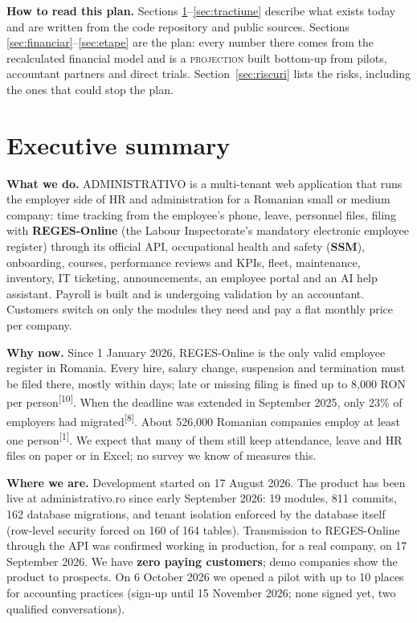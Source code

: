 \documentclass[10pt,a4paper]{article}
\newcommand{\src}[1]{\textsuperscript{\textcolor{brandSlate}{[#1]}}}
\newcommand{\proj}{\textcolor{brandTeal}{\textsc{projection}}}
\begin{document}
\tableofcontents
\vspace{6pt}
\begin{faptbox}
\small\textbf{How to read this plan.} Sections \ref{sec:rezumat}--\ref{sec:tractiune} describe what exists today and are written from
the code repository and public sources. Sections \ref{sec:financiar}--\ref{sec:etape} are the plan: every number there comes from the
recalculated financial model and is a \proj{} built bottom-up from pilots, accountant partners and
direct trials. Section~\ref{sec:riscuri} lists the risks, including the ones that could stop the plan.
\end{faptbox}

\section{Executive summary}\label{sec:rezumat}\nobreak

\textbf{What we do.} ADMINISTRATIVO is a multi-tenant web application that runs the
employer side of HR and administration for a Romanian small or medium company: time
tracking from the employee's phone, leave, personnel files, filing with
\textbf{REGES-Online} (the Labour Inspectorate's mandatory electronic employee register)
through its official API, occupational health and safety (\textbf{SSM}), onboarding,
courses, performance reviews and KPIs, fleet, maintenance, inventory, IT ticketing,
announcements, an employee portal and an AI help assistant. Payroll is built and is
undergoing validation by an accountant. Customers switch on only the modules they need and
pay a flat monthly price per company.

\textbf{Why now.} Since 1 January 2026, REGES-Online is the only valid employee register in
Romania. Every hire, salary change, suspension and termination must be filed there, mostly
within days; late or missing filing is fined up to 8,000 RON per person\src{10}. When the
deadline was extended in September 2025, only 23\% of employers had migrated\src{8}. About
526,000 Romanian companies employ at least one person\src{1}. We expect that many of them still
keep attendance, leave and HR files on paper or in Excel; no survey we know of measures this.

\textbf{Where we are.} Development started on 17 August 2026. The product has been live at
administrativo.ro since early September 2026: 19 modules, 811 commits, 162 database migrations,
and tenant isolation enforced by the database itself (row-level security forced on 160 of 164
tables). Transmission to REGES-Online through the API was confirmed working in production, for a
real company, on 17 September 2026. We have \textbf{zero paying customers}; demo companies show
the product to prospects. On 6 October 2026 we opened a pilot with up to 10 places for
accounting practices (sign-up until 15 November 2026; none signed yet, two qualified conversations).
\end{document}
